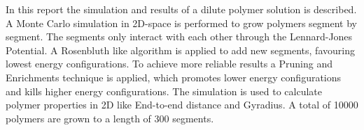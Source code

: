 In this report the simulation and results of a dilute polymer solution is described.  A Monte Carlo simulation in 2D-space is performed to grow polymers segment by segment. The segments only interact with each other through the Lennard-Jones Potential. A Rosenbluth like algorithm is applied to add new segments, favouring lowest energy configurations. To achieve more reliable results a Pruning and Enrichments technique is applied, which promotes lower energy configurations and kills higher energy configurations. The simulation is used to calculate polymer properties in 2D like End-to-end distance and Gyradius. A total of 10000 polymers are grown to a length of 300 segments.